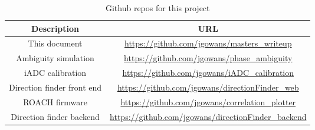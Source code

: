 \begin{table}[h!]
  \centering
  \begin{tabu}{c|c}
    Description & URL \\
    \hline
    This document & \url{https://github.com/jgowans/masters_writeup} \\
    Ambiguity simulation & \url{https://github.com/jgowans/phase_ambiguity} \\
    iADC calibration & \url{https://github.com/jgowans/iADC_calibration} \\
    Direction finder front end & \url{https://github.com/jgowans/directionFinder_web} \\
    ROACH firmware & \url{https://github.com/jgowans/correlation_plotter} \\
    Direction finder backend & \url{https://github.com/jgowans/directionFinder_backend} \\
  \end{tabu}
  \caption{Github repos for this project}
  \label{tab:lit-review-repos}
\end{table}
